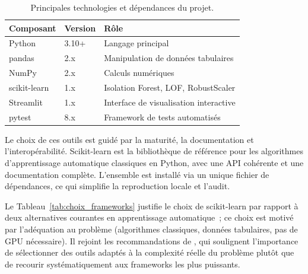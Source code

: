 \begin{table}[H]
    \centering
    \caption{Principales technologies et dépendances du projet.}
    \label{tab:technologies}
    \begin{tabular}{llp{6cm}}
        \toprule
        \textbf{Composant}   & \textbf{Version} & \textbf{Rôle} \\
        \midrule
        Python               & 3.10+            & Langage principal \\
        pandas               & 2.x              & Manipulation de données tabulaires \\
        NumPy                & 2.x              & Calculs numériques \\
        scikit-learn         & 1.x              & Isolation Forest, LOF, RobustScaler \\
        Streamlit            & 1.x              & Interface de visualisation interactive \\
        pytest               & 8.x              & Framework de tests automatisés \\
        \bottomrule
    \end{tabular}
\end{table}

Le choix de ces outils est guidé par la maturité, la documentation et l'interopérabilité.
Scikit-learn \citep{sklearn_api} est la bibliothèque de référence pour les algorithmes
d'apprentissage automatique classiques en Python, avec une API cohérente et une
documentation complète. L'ensemble est installé via un unique fichier de dépendances, ce
qui simplifie la reproduction locale et l'audit.

Le Tableau~\ref{tab:choix_frameworks} justifie le choix de scikit-learn par rapport à
deux alternatives courantes en apprentissage automatique~; ce choix est motivé par
l'adéquation au problème (algorithmes classiques, données tabulaires, pas de GPU
nécessaire). Il rejoint les recommandations de \cite{amershi2019software}, qui
soulignent l'importance de sélectionner des outils adaptés à la complexité réelle du
problème plutôt que de recourir systématiquement aux frameworks les plus puissants.

